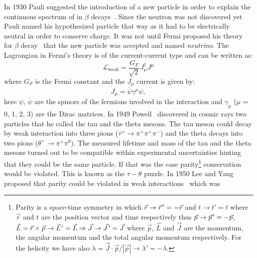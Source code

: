 In 1930 Pauli suggested the introduction of a new particle in order to explain
the continuous spectrum of in $\beta$ decays~\cite{PauliNeutrino}. Since the
neutron was not discovered yet Pauli named his hypothesized particle that way as
it had to be electrically neutral in order to conserve charge. It was not until
Fermi proposed his theory for $\beta$ decay~\cite{FermiTheory, FermiTheoryIta}
that the new particle was accepted and named \emph{neutrino}. The Lagrangian in
Fermi's theory is of the current-current type and can be written as:
\begin{equation}
  \mathcal{L}_\mathrm{weak} = \frac{G_F}{\sqrt{2}} J_\mu^\dagger
  J^\mu
  \label{eq:150}
\end{equation}
where $G_F$ is the Fermi constant and the $J_\mu$ current is given by:
\begin{equation}
  \label{eq:151}
  J_\mu = \overbar{\psi} \gamma^\mu \psi,
\end{equation}
here $\psi$, $\overbar{\psi}$ are the spinors of the fermions involved in the
interaction and $\gamma_\mu$ ($\mu =$ 0, 1, 2, 3) are the Dirac matrices. In
1949 Powell~\cite{PowellTauMeson} discovered in cosmic rays two particles that
he called the tau and the theta mesons. The tau meson could decay by weak
interaction into three pions ($\tau^+ \rightarrow \pi^+ \pi^+ \pi^-$) and the
theta decays into two pions ($\theta^+ \rightarrow \pi^+ \pi^0$). The measured
lifetime and mass of the tau and the theta mesons turned out to be compatible
within experimental uncertainties hinting that they could be the same
particle. If that was the case parity\footnote{Parity is a space-time symmetry
  in which $\vec{r} \rightarrow \pvec{r}' = - \vec{r}$ and
  $t \rightarrow t' = t$ where $\vec{r}$ and $t$ are the position vector and
  time respectively thus $\vec{p} \rightarrow \pvec{p}' = - \vec{p}$,
  $\vec{L} = \vec{r} \times \vec{p} \rightarrow \pvec{L}' = \vec{L} \Rightarrow
  \vec{J} \rightarrow \pvec{J}' = \vec{J}$ where $\vec{p}$, $\vec{L}$ and
  $\vec{J}$ are the momentum, the angular momentum and the total angular
  momentum respectively. For the helicity we have also
  $\lambda = \vec{J} \cdot \vec{p} / |\vec{p}| \rightarrow \lambda' = -
  \lambda$.} conservation would be violated. This is known as the
$\tau - \theta$ puzzle. In 1950 Lee and Yang proposed that parity could be
violated in weak interactions~\cite{LeeYangParityViolation} which was
